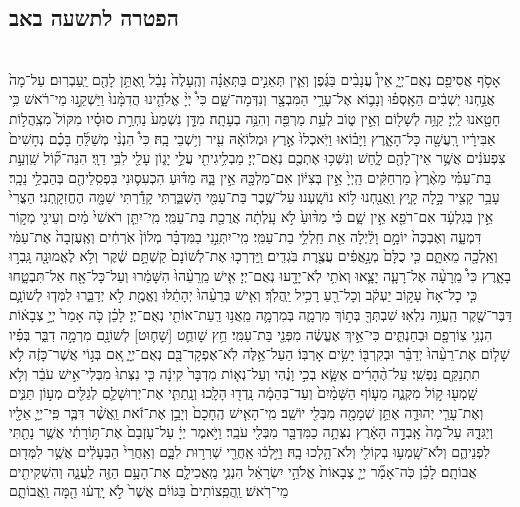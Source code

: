 \documentclass[twoside, openany, parskip=half, 11pt]{book}
\begin{document}
\begin{footnotesize}
\section*{הפטרה לתשעה באב}


\begin{multicols}{2}
 \\
אָסֹ֥ף אֲסִיפֵ֖ם נְאֻם־יְיָ֑ אֵין֩ עֲנָבִ֨ים בַּגֶּ֜פֶן וְאֵ֧ין תְּאֵנִ֣ים בַּתְּאֵנָ֗ה וְהֶֽעָלֶה֙ נָבֵ֔ל וָֽאֶתֵּ֥ן לָהֶ֖ם יַֽעַבְרֽוּם׃ עַל־מָה֙ אֲנַ֣חְנוּ יֽשְׁבִ֔ים הֵאָֽסְפ֗וּ וְנָב֛וֹא אֶל־עָרֵ֥י הַמִּבְצָ֖ר וְנִדְּמָה־שָּׁ֑ם כִּי֩ יְיָ֨ אֱלֹהֵ֤ינוּ הֲדִמָּ֨נוּ֙ וַיַּשְׁקֵ֣נוּ מֵי־רֹ֔אשׁ כִּ֥י חָטָ֖אנוּ לַֽיְיָ׃ קַוֵּ֥ה לְשָׁל֖וֹם וְאֵ֣ין ט֑וֹב לְעֵ֥ת מַרְפֵּ֖ה וְהִנֵּ֥ה בְעָתָֽה׃ מִדָּ֤ן נִשְׁמַע֙ נַחְרַ֣ת סוּסָ֗יו מִקּוֹל֙ מִצְֽהֲל֣וֹת אַבִּירָ֔יו רָֽעֲשָׁ֖ה כָּל־הָאָ֑רֶץ וַיָּב֗וֹאוּ וַיֹּֽאכְלוּ֙ אֶ֣רֶץ וּמְלוֹאָ֔הּ עִ֖יר וְי֥שְׁבֵי בָֽהּ׃ כִּי֩ הִנְנִ֨י מְשַׁלֵּ֜חַ בָּכֶ֗ם נְחָשִׁים֙ צִפְעֹנִ֔ים אֲשֶׁ֥ר אֵין־לָהֶ֖ם לָ֑חַשׁ וְנִשְּׁכ֥וּ אֶתְכֶ֖ם נְאֻם־יְיָ׃ מַבְלִ֥יגִיתִ֖י עֲלֵ֣י יָג֑וֹן עָלַ֖י לִבִּ֥י דַוָּֽי׃ הִנֵּה־ק֞וֹל שַֽׁוְעַ֣ת בַּת־עַמִּ֗י מֵאֶ֨רֶץ֙ מַרְחַקִּ֔ים הַֽיְיָ֙ אֵ֣ין בְּצִיּ֔וֹן אִם־מַלְכָּ֖הּ אֵ֣ין בָּ֑הּ מַדּ֗וּעַ הִכְעִס֛וּנִי בִּפְסִֽלֵיהֶ֖ם בְּהַבְלֵ֥י נֵכָֽר׃ עָבַ֥ר קָצִ֖יר כָּ֣לָה קָ֑יִץ וַֽאֲנַ֖חְנוּ ל֥וֹא נוֹשָֽׁעְנוּ׃ עַל־שֶׁ֥בֶר בַּת־עַמִּ֖י הָשְׁבַּ֑רְתִּי קָדַ֕רְתִּי שַׁמָּ֖ה הֶחֱזִקָֽתְנִי׃ הַצֳרִי֙ אֵ֣ין בְּגִלְעָ֔ד אִם־רֹפֵ֖א אֵ֣ין שָׁ֑ם כִּ֗י מַדּ֨וּעַ֙ לֹ֣א עָֽלְתָ֔ה אֲרֻכַ֖ת בַּת־עַמִּֽי׃ מִֽי־יִתֵּ֤ן רֹאשִׁי֙ מַ֔יִם וְעֵינִ֖י מְק֣וֹר דִּמְעָ֑ה וְאֶבְכֶּה֙ יוֹמָ֣ם וָלַ֔יְלָה אֵ֖ת חַֽלְלֵ֥י בַת־עַמִּֽי׃ מִֽי־יִתְּנֵ֣נִי בַמִּדְבָּ֗ר מְלוֹן֙ אֹֽרְחִ֔ים וְאֶֽעֶזְבָה֙ אֶת־עַמִּ֔י וְאֵֽלְכָ֖ה מֵאִתָּ֑ם כִּ֤י כֻלָּם֙ מְנָ֣אֲפִ֔ים עֲצֶ֖רֶת בֹּֽגְדִֽים׃ וַֽיַּדְרְכ֤וּ אֶת־לְשׁוֹנָם֙ קַשְׁתָּ֣ם שֶׁ֔קֶר וְלֹ֥א לֶאֱמוּנָ֖ה גָּֽבְר֣וּ בָאָ֑רֶץ כִּי֩ מֵֽרָעָ֨ה אֶל־רָעָ֧ה יָצָ֛אוּ וְאֹתִ֥י לֹֽא־יָדָ֖עוּ נְאֻם־יְיָ׃ אִ֤ישׁ מֵֽרֵעֵ֨הוּ֙ הִשָּׁמֵ֔רוּ וְעַל־כָּל־אָ֖ח אַל־תִּבְטָ֑חוּ כִּ֤י כָל־אָח֙ עָק֣וֹב יַעְקֹ֔ב וְכָל־רֵ֖עַ רָכִ֥יל יַֽהֲלֹֽךְ׃ וְאִ֤ישׁ בְּרֵעֵ֨הוּ֙ יְהָתֵ֔לּוּ וֶאֱמֶ֖ת לֹ֣א יְדַבֵּ֑רוּ לִמְּד֧וּ לְשׁוֹנָ֛ם דַּבֶּר־שֶׁ֖קֶר הַֽעֲוֵ֥ה נִלְאֽוּ׃ שִׁבְתְּךָ֖ בְּת֣וֹךְ מִרְמָ֑ה בְּמִרְמָ֛ה מֵֽאֲנ֥וּ דַֽעַת־אוֹתִ֖י נְאֻם־יְיָ׃ לָכֵ֗ן כֹּ֤ה אָמַר֙ יְיָ֣ צְבָא֔וֹת הִנְנִ֥י צֽוֹרְפָ֖ם וּבְחַנְתִּ֑ים כִּי־אֵ֣יךְ אֶעֱשֶׂ֔ה מִפְּנֵ֖י בַּת־עַמִּֽי׃ חֵ֥ץ שָׁוחֻ֛ט [שָׁח֛וּט] לְשׁוֹנָ֖ם מִרְמָ֣ה דִבֵּ֑ר בְּפִ֗יו שָׁל֤וֹם אֶת־רֵעֵ֨הוּ֙ יְדַבֵּ֗ר וּבְקִרְבּ֖וֹ יָשִׂ֥ים אָרְבּֽוֹ׃ הַעַל־אֵ֥לֶּה לֹֽא־אֶפְקָד־בָּ֖ם נְאֻם־יְיָ֑ אִ֚ם בְּג֣וֹי אֲשֶׁר־כָּזֶ֔ה לֹ֥א תִתְנַקֵּ֖ם נַפְשִֽׁי׃ עַל־הֶ֨הָרִ֜ים אֶשָּׂ֧א בְכִ֣י וָנֶ֗הִי וְעַל־נְא֤וֹת מִדְבָּר֙ קִינָ֔ה כִּ֤י נִצְּתוּ֙ מִבְּלִי־אִ֣ישׁ עֹבֵ֔ר וְלֹ֥א שָֽׁמְע֖וּ ק֣וֹל מִקְנֶ֑ה מֵע֤וֹף הַשָּׁמַ֨יִם֙ וְעַד־בְּהֵמָ֔ה נָֽדְד֖וּ הָלָֽכוּ׃ וְנָֽתַתִּ֧י אֶת־יְרֽוּשָׁלַ֛םִ לְגַלִּ֖ים מְע֣וֹן תַּנִּ֑ים וְאֶת־עָרֵ֧י יְהוּדָ֛ה אֶתֵּ֥ן שְׁמָמָ֖ה מִבְּלִ֖י יוֹשֵֽׁב׃ מִֽי־הָאִ֤ישׁ הֶֽחָכָם֙ וְיָבֵ֣ן אֶת־זֹ֔את וַֽאֲשֶׁ֨ר דִּבֶּ֧ר פִּֽי־יְיָ֛ אֵלָ֖יו וְיַגִּדָ֑הּ עַל־מָה֙ אָֽבְדָ֣ה הָאָ֔רֶץ נִצְּתָ֥ה כַמִּדְבָּ֖ר מִבְּלִ֖י עֹבֵֽר׃ וַיֹּ֣אמֶר יְיָ֔ עַל־עָזְבָם֙ אֶת־תּ֣וֹרָתִ֔י אֲשֶׁ֥ר נָתַ֖תִּי לִפְנֵיהֶ֑ם וְלֹא־שָֽׁמְע֥וּ בְקוֹלִ֖י וְלֹא־הָ֥לְכוּ בָֽהּ׃ וַיֵּ֣לְכ֔וּ אַֽחֲרֵ֖י שְׁרִר֣וּת לִבָּ֑ם וְאַֽחֲרֵי֙ הַבְּעָלִ֔ים אֲשֶׁ֥ר לִמְּד֖וּם אֲבוֹתָֽם׃ לָכֵ֗ן כֹּֽה־אָמַ֞ר יְיָ֤ צְבָאוֹת֙ אֱלֹהֵ֣י יִשְׂרָאֵ֔ל הִנְנִ֧י מַֽאֲכִילָ֛ם אֶת־הָעָ֥ם הַזֶּ֖ה לַֽעֲנָ֑ה וְהִשְׁקִיתִ֖ים מֵי־רֹֽאשׁ׃ וַֽהֲפִֽצוֹתִים֙ בַּגּוֹיִ֔ם אֲשֶׁר֙ לֹ֣א יָֽדְע֔וּ הֵ֖מָּה וַֽאֲבוֹתָ֑ם 
\end{multicols}
\end{footnotesize}
\end{document}
